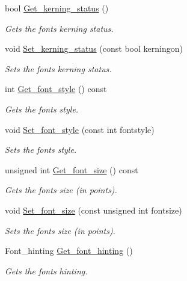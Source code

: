 \begin{DoxyCompactItemize}
bool \hyperlink{classjetfuel_1_1draw_1_1Text_a35deab301fc970a0f23e490156720776}{Get\+\_\+kerning\+\_\+status} ()
\begin{DoxyCompactList}\small\item\em Gets the font\textquotesingle{}s kerning status. \end{DoxyCompactList}\item 
void \hyperlink{classjetfuel_1_1draw_1_1Text_afdd2ce09d49b3df880939af1a5d5053c}{Set\+\_\+kerning\+\_\+status} (const bool kerningon)
\begin{DoxyCompactList}\small\item\em Sets the font\textquotesingle{}s kerning status. \end{DoxyCompactList}\item 
int \hyperlink{classjetfuel_1_1draw_1_1Text_ade8bf8912e12bfae87a47f15e312f3f0}{Get\+\_\+font\+\_\+style} () const
\begin{DoxyCompactList}\small\item\em Gets the font\textquotesingle{}s style. \end{DoxyCompactList}\item 
void \hyperlink{classjetfuel_1_1draw_1_1Text_aec048bedd8cacb8523c4b2a3121f4179}{Set\+\_\+font\+\_\+style} (const int fontstyle)
\begin{DoxyCompactList}\small\item\em Sets the font\textquotesingle{}s style. \end{DoxyCompactList}\item 
unsigned int \hyperlink{classjetfuel_1_1draw_1_1Text_aeb691f0eb368473f5691895212daf431}{Get\+\_\+font\+\_\+size} () const
\begin{DoxyCompactList}\small\item\em Gets the font\textquotesingle{}s size (in points). \end{DoxyCompactList}\item 
void \hyperlink{classjetfuel_1_1draw_1_1Text_a488868c8aa0fcc692cd7a37b8abe13f2}{Set\+\_\+font\+\_\+size} (const unsigned int fontsize)
\begin{DoxyCompactList}\small\item\em Sets the font\textquotesingle{}s size (in points). \end{DoxyCompactList}\item 
Font\+\_\+hinting \hyperlink{classjetfuel_1_1draw_1_1Text_af9719fdfc0d04106843a69674df3d2c7}{Get\+\_\+font\+\_\+hinting} ()
\begin{DoxyCompactList}\small\item\em Gets the font\textquotesingle{}s hinting. \end{DoxyCompactList}\item 

\end{DoxyCompactItemize}
